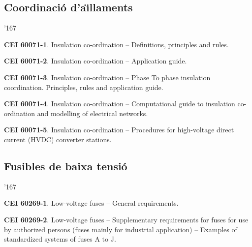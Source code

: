 \subsection*{Coordinaci\'{o} d'a\"{\i}llaments}
\begin{dinglist}{'167}
    \item \textbf{CEI 60071-1}. Insulation co-ordination -- Definitions, principles and rules.
    \item \textbf{CEI 60071-2}. Insulation co-ordination -- Application guide.
    \item \textbf{CEI 60071-3}. Insulation co-ordination -- Phase To phase insulation coordination. Principles, rules and application guide.
    \item \textbf{CEI 60071-4}. Insulation co-ordination -- Computational guide to insulation co-ordination and modelling of electrical networks.
    \item \textbf{CEI 60071-5}. Insulation co-ordination -- Procedures for high-voltage direct current (HVDC) converter stations.
\end{dinglist}

\subsection*{Fusibles de baixa tensi\'{o}}
\begin{dinglist}{'167}
    \item \textbf{CEI 60269-1}. Low-voltage fuses -- General requirements.
    \item \textbf{CEI 60269-2}. Low-voltage fuses -- Supplementary requirements for fuses for use by authorized persons
          (fuses mainly for industrial application) -- Examples of standardized systems of fuses A to J.
\end{dinglist}

